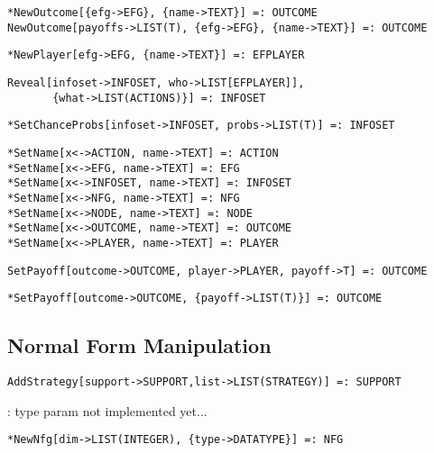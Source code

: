 \protect \large \begin{verbatim} 
*NewOutcome[{efg->EFG}, {name->TEXT}] =: OUTCOME
NewOutcome[payoffs->LIST(T), {efg->EFG}, {name->TEXT}] =: OUTCOME
\end{verbatim}\normalsize

\protect \large \begin{verbatim}
*NewPlayer[efg->EFG, {name->TEXT}] =: EFPLAYER 
\end{verbatim}\normalsize

\protect \large \begin{verbatim}
Reveal[infoset->INFOSET, who->LIST[EFPLAYER]],
       {what->LIST(ACTIONS)}] =: INFOSET
\end{verbatim}\normalsize

\protect \large \begin{verbatim} 
*SetChanceProbs[infoset->INFOSET, probs->LIST(T)] =: INFOSET
\end{verbatim}\normalsize

\protect \large \begin{verbatim}
*SetName[x<->ACTION, name->TEXT] =: ACTION
*SetName[x<->EFG, name->TEXT] =: EFG
*SetName[x<->INFOSET, name->TEXT] =: INFOSET
*SetName[x<->NFG, name->TEXT] =: NFG
*SetName[x<->NODE, name->TEXT] =: NODE
*SetName[x<->OUTCOME, name->TEXT] =: OUTCOME
*SetName[x<->PLAYER, name->TEXT] =: PLAYER
\end{verbatim}\normalsize

\protect \large \begin{verbatim}
SetPayoff[outcome->OUTCOME, player->PLAYER, payoff->T] =: OUTCOME
\end{verbatim}\normalsize

\protect \large \begin{verbatim}
*SetPayoff[outcome->OUTCOME, {payoff->LIST(T)}] =: OUTCOME
\end{verbatim}\normalsize

\medskip
\subsection{Normal Form Manipulation}

\protect \large \begin{verbatim}
AddStrategy[support->SUPPORT,list->LIST(STRATEGY)] =: SUPPORT
\end{verbatim}\normalsize

: type param not implemented yet...
\protect \large \begin{verbatim}
*NewNfg[dim->LIST(INTEGER), {type->DATATYPE}] =: NFG
\end{verbatim}\normalsize

